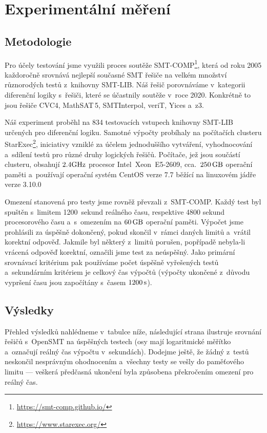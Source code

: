 \chapter{Experimentální měření}\label{experiment}

\section{Metodologie}

Pro účely testování jsme využili proces soutěže SMT-COMP\footnote{\url{https://smt-comp.github.io/}}, která od roku 2005 každoročně srovnává nejlepší současné SMT řešiče na velkém množství různorodých testů z~knihovny SMT-LIB. Náš řešič porovnáváme v~kategorii diferenční logiky s~řešiči, které se účastnily soutěže v~roce 2020. Konkrétně to jsou řešiče CVC4, MathSAT\,5, SMTInterpol, veriT, Yices a~z3.

Náš experiment proběhl na 834 testovacích vstupech knihovny SMT-LIB určených pro diferenční logiku. Samotné výpočty probíhaly na počítačích clusteru StarExec\footnote{\url{https://www.starexec.org/}}, iniciativy vzniklé za účelem jednoduššího vytváření, vyhodnocování a~sdílení testů pro různé druhy logických řešičů. Počítače, jež jsou součástí clusteru, obsahují $2.4\rm GHz$ procesor Intel\textregistered\ Xeon\textregistered\ E5-2609, cca.~$250\,\rm GB$ operační paměti a~používají operační systém CentOS verze 7.7 běžící na linuxovém jádře verze 3.10.0

Omezení stanovená pro testy jsme rovněž převzali z~SMT-COMP. Každý test byl spuštěn s~limitem 1200~sekund reálného času, respektive 4800 sekund procesorového času a~s~omezením na $60\,\rm GB$ operační paměti. Výpočet jsme prohlásili za úspěšně dokončený, pokud skončil v~rámci daných limitů a~vrátil korektní odpověď. Jakmile byl některý z~limitů porušen, popřípadě nebyla-li vrácená odpověď korektní, označili jsme test za neúspěšný. Jako primární srovnávací kritérium pak používáme počet úspěšně vyřešených testů a~sekundárním kritériem je celkový čas výpočtů (výpočty ukončené z~důvodu vypršení času jsou započítány s~časem $1200\,\rm s$).

\section{Výsledky}

Přehled výsledků nahlédneme v~tabulce níže, následující strana ilustruje srovnání řešičů s~OpenSMT na úspěšných testech (osy mají logaritmické měřítko a~označují reálný čas výpočtu v~sekundách). Dodejme ještě, že žádný z~testů neskončil nesprávným ohodnocením a~všechny testy se vešly do paměťového limitu --- veškerá předčasná ukončení byla způsobena překročením omezení pro reálný čas.

